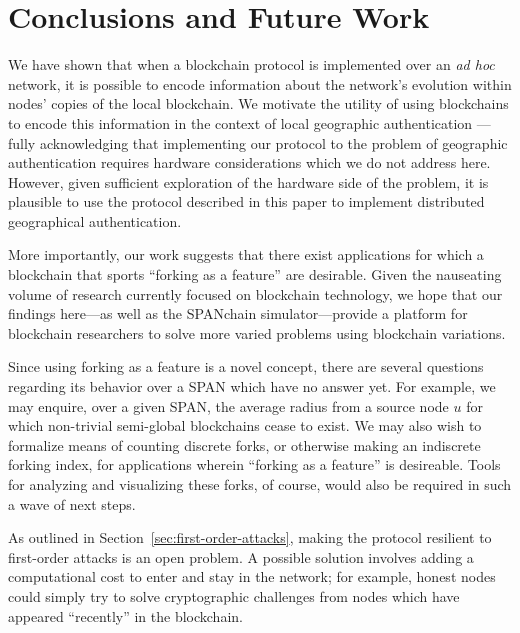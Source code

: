 \section{Conclusions and Future Work}


We have shown that when a blockchain protocol is implemented over an
\textit{ad hoc} network, it is possible to encode information about the network's evolution within
nodes' copies of the local blockchain. We motivate the utility of using blockchains
to encode this information in the context of local geographic authentication
---fully acknowledging that implementing our protocol to the problem of geographic
authentication requires hardware considerations which we do not address here.
However, given sufficient exploration of the hardware side of the problem,
it is plausible to use the protocol described in this paper
to implement distributed geographical authentication.

More importantly, our work suggests that there exist applications for which
a blockchain that sports ``forking as a feature'' are desirable. Given the
nauseating volume of research currently focused on blockchain technology,
we hope that our findings here---as well as the SPANchain simulator---provide
a platform for blockchain researchers to solve more varied problems using
blockchain variations.

Since using forking as a feature is a novel concept,
there are several questions regarding its behavior over a SPAN
which have no answer yet.
For example,
we may enquire, over a given SPAN, the average radius from a source node $u$
for which non-trivial semi-global blockchains cease to exist. We may also wish
to formalize means of counting discrete forks, or otherwise making an indiscrete
forking index, for applications wherein ``forking as a feature'' is desireable.
Tools for analyzing and visualizing these forks, of course, would also be 
required in such a wave of next steps.

As outlined in Section~\ref{sec:first-order-attacks},
making the protocol resilient to first-order attacks is an open problem.
A possible solution involves adding a computational cost
to enter and stay in the network;
for example,
honest nodes could simply try to solve cryptographic challenges
from nodes which have appeared ``recently'' in the blockchain.
